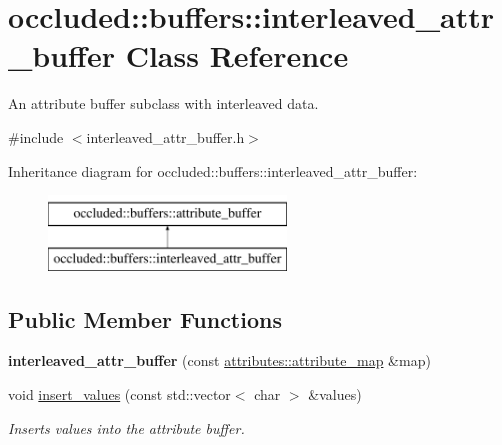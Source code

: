 \hypertarget{classoccluded_1_1buffers_1_1interleaved__attr__buffer}{\section{occluded\+:\+:buffers\+:\+:interleaved\+\_\+attr\+\_\+buffer Class Reference}
\label{classoccluded_1_1buffers_1_1interleaved__attr__buffer}
}


An attribute buffer subclass with interleaved data.  




{\ttfamily \#include $<$interleaved\+\_\+attr\+\_\+buffer.\+h$>$}

Inheritance diagram for occluded\+:\+:buffers\+:\+:interleaved\+\_\+attr\+\_\+buffer\+:\begin{figure}[H]
\begin{center}
\leavevmode
\includegraphics[height=2.000000cm]{classoccluded_1_1buffers_1_1interleaved__attr__buffer}
\end{center}
\end{figure}
\subsection*{Public Member Functions}
\begin{DoxyCompactItemize}
\item 
\hypertarget{classoccluded_1_1buffers_1_1interleaved__attr__buffer_af40be210a1b5468d1696e1cb1e9f663b}{{\bfseries interleaved\+\_\+attr\+\_\+buffer} (const \hyperlink{classoccluded_1_1buffers_1_1attributes_1_1attribute__map}{attributes\+::attribute\+\_\+map} \&map)}\label{classoccluded_1_1buffers_1_1interleaved__attr__buffer_af40be210a1b5468d1696e1cb1e9f663b}

\item 
void \hyperlink{classoccluded_1_1buffers_1_1interleaved__attr__buffer_a7347f20462c3bb9744602fc159e54e00}{insert\+\_\+values} (const std\+::vector$<$ char $>$ \&values)
\begin{DoxyCompactList}\small\item\em Inserts values into the attribute buffer. \end{DoxyCompactList}\end{DoxyCompactItemize}
